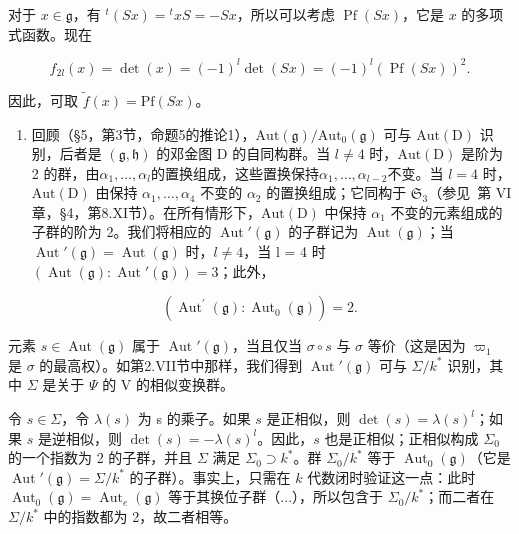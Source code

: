 对于 \(x \in \mathfrak{g}\)，有 \({}^t(Sx) = {}^t xS = -Sx\)，所以可以考虑 \(\operatorname{Pf}(Sx)\)，它是 \(x\) 的多项式函数。现在

\[
f _ {2 l} (x) = \det (x) = (- 1) ^ {l} \det (S x) = (- 1) ^ {l} (\operatorname{Pf} (S x)) ^ {2}.
\]

因此，可取 \(\tilde{f}(x) = \mathrm{Pf}(Sx)\)。

\begin{enumerate}
\def\labelenumi{(\Roman{enumi})}
\setcounter{enumi}{6}
\tightlist
\item
回顾（§5，第3节，命题5的推论1），\(\mathrm{Aut}(\mathfrak{g}) / \mathrm{Aut}_0(\mathfrak{g})\) 可与 \(\mathrm{Aut}(\mathrm{D})\) 识别，后者是 \((\mathfrak{g},\mathfrak{h})\) 的邓金图 D 的自同构群。当 \(l\neq 4\) 时，\(\mathrm{Aut}(\mathrm{D})\) 是阶为 2 的群，由\(\alpha_{1},\ldots ,\alpha_{l}\)的置换组成，这些置换保持\(\alpha_{1},\ldots ,\alpha_{l - 2}\)不变。当 \(l = 4\) 时，\(\mathrm{Aut}(\mathrm{D})\) 由保持 \(\alpha_{1},\ldots ,\alpha_{4}\) 不变的 \(\alpha_{2}\) 的置换组成；它同构于 \(\mathfrak{S}_3\)（参见~第 VI 章，§4，第8.XI节）。在所有情形下，\(\mathrm{Aut}(\mathrm{D})\) 中保持 \(\alpha_{1}\) 不变的元素组成的子群的阶为 2。我们将相应的 \(\operatorname{Aut}'(\mathfrak{g})\) 的子群记为 \(\operatorname{Aut}(\mathfrak{g})\)；当 \(\operatorname{Aut}'(\mathfrak{g}) = \operatorname{Aut}(\mathfrak{g})\) 时，\(l \neq 4\)，当 l = 4 时 \((\operatorname{Aut}(\mathfrak{g}) : \operatorname{Aut}'(\mathfrak{g})) = 3\)；此外，
\end{enumerate}

\[
\left(\operatorname{Aut} ^ {\prime} (\mathfrak {g}): \operatorname{Aut} _ {0} (\mathfrak {g})\right) = 2.
\]

元素 \(s \in \operatorname{Aut}(\mathfrak{g})\) 属于 \(\operatorname{Aut}'(\mathfrak{g})\)，当且仅当 \(\sigma \circ s\) 与 \(\sigma\) 等价（这是因为 \(\varpi_{1}\) 是 \(\sigma\) 的最高权）。如第2.VII节中那样，我们得到 \(\operatorname{Aut}'(\mathfrak{g})\) 可与 \(\Sigma/k^{*}\) 识别，其中 \(\Sigma\) 是关于 \(\Psi\) 的 V 的相似变换群。

令 \(s \in \Sigma\)，令 \(\lambda(s)\) 为 s 的乘子。如果 \(s\) 是正相似，则 \(\det(s) = \lambda(s)^l\)；如果 \(s\) 是逆相似，则 \(\det(s) = -\lambda(s)^l\)。因此，\(s\) 也是正相似；正相似构成 \(\Sigma_0\) 的一个指数为 2 的子群，并且 \(\Sigma\) 满足 \(\Sigma_0 \supset k^*\)。群 \(\Sigma_0 / k^*\) 等于 \(\operatorname{Aut}_0(\mathfrak{g})\)（它是 \(\operatorname{Aut}'(\mathfrak{g}) = \Sigma / k^*\) 的子群）。事实上，只需在 \(k\) 代数闭时验证这一点：此时 \(\operatorname{Aut}_0(\mathfrak{g}) = \operatorname{Aut}_e(\mathfrak{g})\) 等于其换位子群（...），所以包含于 \(\Sigma_0 / k^*\)；而二者在 \(\Sigma / k^*\) 中的指数都为 2，故二者相等。

